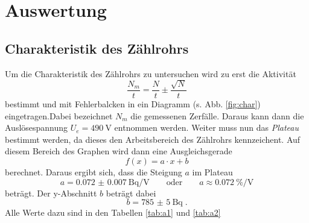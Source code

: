 \section{Auswertung}
\label{sec:Auswertung}

\subsection{Charakteristik des Zählrohrs}
Um die Charakteristik des Zählrohrs zu untersuchen wird zu erst die Aktivität
\begin{equation}
 \frac{N_m}{t} = \frac{N}{t} \pm \frac{\sqrt{N}}{t}
 \label{eqn:N}
\end{equation}
bestimmt und mit Fehlerbalcken in ein Diagramm (s. Abb. \ref{fig:char})
eingetragen.Dabei bezeichnet $N_m$ die gemessenen Zerfälle.
Daraus kann dann die Auslösespannung $ U_e = \SI{490}{\volt}$
entnommen werden. Weiter muss nun das \textit{Plateau} \cite{Anleitung}
bestimmt werden, da
dieses den Arbeitsbereich des Zählrohrs kennzeichent. Auf diesem Bereich
des Graphen wird dann eine Ausgleichsgerade
\begin{equation*}
  f\left(x \right) = a \cdot x + b
\end{equation*}
berechnet. Daraus ergibt sich, dass die Steigung $a$ im Plateau
\begin{equation*}
  a = \SI{0.072(7)}{\becquerel\per\volt} \qquad \text{oder} \qquad  a \approx \SI{0.072}{\percent\per\volt}
\end{equation*}
beträgt. Der y-Abschnitt $b$ beträgt dabei
\begin{equation*}
  b = \SI{785(5)}{\becquerel} \;.
\end{equation*}
Alle Werte dazu sind in den Tabellen \ref{tab:a1} und \ref{tab:a2}

